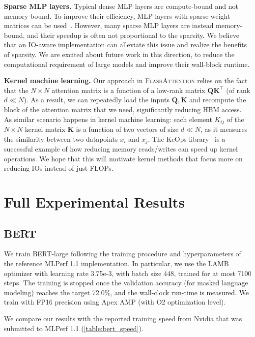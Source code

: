 \documentclass{article}
\newcommand{\vQ}{\mathbf{Q}}
\newcommand{\vK}{\mathbf{K}}
\newcommand{\sysname}{\textsc{FlashAttention}\xspace}
\begin{document}
\textbf{Sparse MLP layers.}
Typical dense MLP layers are compute-bound and not memory-bound.
To improve their efficiency, MLP layers with sparse weight matrices can be
used~\citep{dao2021pixelated}.
However, many sparse MLP layers are instead memory-bound, and their speedup is
often not proportional to the sparsity.
We believe that an IO-aware implementation can alleviate this issue and realize
the benefits of sparsity.
We are excited about future work in this direction, to reduce the computational
requirement of large models and improve their wall-block runtime.

\textbf{Kernel machine learning.}
Our approach in \sysname relies on the fact that the $N \times N$ attention matrix is
a function of a low-rank matrix $\vQ \vK^\top$ (of rank $d \ll N$).
As a result, we can repeatedly load the inputs $\vQ, \vK$ and recompute the
block of the attention matrix that we need, significantly reducing HBM access.
As similar scenario happens in kernel machine learning: each element $K_{ij}$ of the
$N \times N$ kernel matrix $\vK$ is a function of two vectors of size $d \ll N$, as it
measures the similarity between two datapoints $x_i$ and $x_j$.
The KeOps library~\citep{feydy2020fast,charlier2021kernel} is a successful example of how
reducing memory reads/writes can speed up kernel operations.
We hope that this will motivate kernel methods that focus more on reducing IOs
instead of just FLOPs.

\section{Full Experimental Results}
\label{sec:experiment_details}

\subsection{BERT}
\label{subsec:bert_details}

We train BERT-large following the training procedure and hyperparameters of the
reference MLPerf 1.1 implementation.
In particular, we use the LAMB optimizer with learning rate 3.75e-3, with batch
size 448, trained for at most 7100 steps.
The training is stopped once the validation accuracy (for masked language
modeling) reaches the target 72.0\%, and the wall-clock run-time is measured.
We train with FP16 precision using Apex AMP (with O2 optimization level).

We compare our results with the reported training speed from Nvidia that was
submitted to MLPerf 1.1 (\cref{table:bert_speed}).
\end{document}
